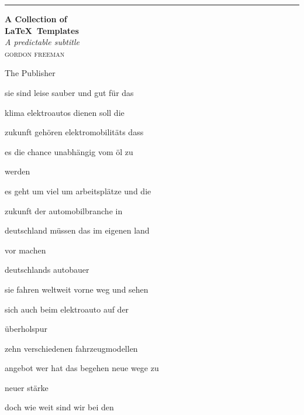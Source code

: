 \documentclass[a4paper, 11pt]{book} %
\newcommand*{\plogo}{\fbox{$\mathcal{PL}$}} %
\begin{document}
\begin{titlepage} %
	
	\raggedleft %
	
	\rule{1pt}{\textheight} %
	\hspace{0.05\textwidth} %
	\parbox[b]{0.75\textwidth}{ %
		
		{\Huge\bfseries A Collection of \\[0.5\baselineskip] \LaTeX ~Templates}\\[2\baselineskip] %
		{\large\textit{A predictable subtitle}}\\[4\baselineskip] %
		{\Large\textsc{gordon freeman}} %
		
		\vspace{0.5\textheight} %
		
		{\noindent The Publisher~~\plogo}\\[\baselineskip] %
	}

\end{titlepage}
sie sind leise sauber und gut für das

klima elektroautos dienen soll die

zukunft gehören elektromobilitäts dass

es die chance unabhängig vom öl zu

werden

es geht um viel um arbeitsplätze und die

zukunft der automobilbranche in

deutschland müssen das im eigenen land

vor machen

deutschlands autobauer

sie fahren weltweit vorne weg und sehen

sich auch beim elektroauto auf der

überholspur

zehn verschiedenen fahrzeugmodellen

angebot wer hat das begehen neue wege zu

neuer stärke

doch wie weit sind wir bei den
\end{document}
